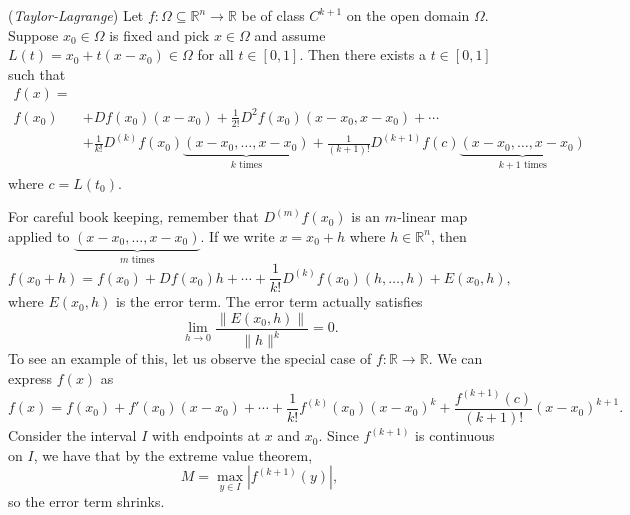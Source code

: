 \documentclass[11pt]{article}
\theoremstyle{definition}
\newcommand{\R}{\mathbb{R}}                      %
\begin{document}
\begin{shaded}

\theorem(\textit{Taylor-Lagrange}) Let $f:\Omega\subseteq \R^n \to \R$ be of class $C^{k+1}$ on the open domain $\Omega$. Suppose $x_0\in\Omega$ is fixed and pick $x\in\Omega$ and assume $L(t)=x_0+t(x-x_0)\in \Omega$ for all $t\in[0,1]$. Then there exists a $t\in[0,1]$ such that
$$
\begin{aligned}
    f(x)=&\\
f(x_0)&+Df(x_0)(x-x_0)+\frac{1}{2!}D^2f(x_0)(x-x_0,x-x_0)+\cdots \\
&+ \frac{1}{k!}D^{(k)}f(x_0)\underbrace{(x-x_0,\dots,x-x_0)}_{k\mbox{ times}}+\frac{1}{(k+1)!}D^{(k+1)}f(c)\underbrace{(x-x_0,\dots,x-x_0)}_{k+1\mbox{ times}}
\end{aligned}
$$
where $c=L(t_0)$.
\end{shaded}
\note For careful book keeping, remember that $D^{(m)}f(x_0)$ is an $m$-linear map applied to $\underbrace{(x-x_0,\dots,x-x_0)}_{m\mbox{ times}}$.
\note If we write $x=x_0+h$ where $h\in\R^n$, then 
$$
f(x_0+h)=f(x_0)+Df(x_0)h+\cdots+\frac{1}{k!}D^{(k)}f(x_0)(h,\dots,h)+E(x_0,h),
$$
where $E(x_0,h)$ is the error term. The error term actually satisfies
$$
\lim_{h\to 0}\frac{\|E(x_0,h)\|}{\|h\|^k}=0.
$$
To see an example of this, let us observe the special case of $f:\R\to \R$. We can express $f(x)$ as
$$
f(x)=f(x_0)+f'(x_0)(x-x_0)+\cdots+\frac{1}{k!}f^{(k)}(x_0)(x-x_0)^k+\frac{f^{(k+1)}(c)}{(k+1)!}(x-x_0)^{k+1}.
$$
Consider the interval $I$ with endpoints at $x$ and $x_0$. Since $f^{(k+1)}$ is continuous on $I$, we have that by the extreme value theorem,
$$
M=\max_{y\in I}|f^{(k+1)}(y)|,
$$
so the error term shrinks.
\end{document}
